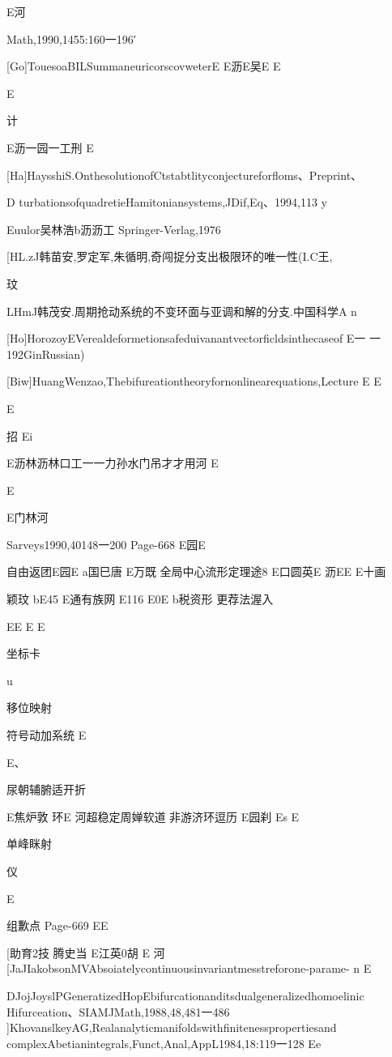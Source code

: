 E河

Math,1990,1455:160一196′

[Go]TouesoaBILSummaneuricorscovweterE
E沥E吴E
E

E

计

E沥一园一工刑
E

[Ha]HaysshiS.OnthesolutionofCtstabtlityconjectureforfloms、Preprint、

D
turbationsofquadretieHamitoniansystems,JDif,Eq、1994,113
y

Euulor吴林浩b沥沥工
Springer-Verlag,1976

[HL.zJ韩苗安,罗定军,朱循明,奇闯捉分支出极限环的唯一性(I.C王,

玟

LHmJ韩茂安.周期抢动系统的不变环面与亚调和解的分支.中国科学A
n

[Ho]HorozoyEVerealdeformetionsafeduivanantvectorficldsinthecaseof
E一
一192GinRussian)

[Biw]HuangWenzao,Thebifureationtheoryfornonlinearequations,Lecture
E
E

E

招
Ei

E沥林沥林口工一一力孙水门吊才才用河
E

E

E门林河

Sarveys1990,40148一200
Page-668
E园E

自由返团E园E
a国巳唐
E万既
全局中心流形定理途8
E口圆英E
沥EE
E十画

颖玟
bE45
E通有族网
E116
E0E
b税资形
更荐法渥入

EE
E
E

坐标卡

u

移位映射

符号动加系统
E

E、

尿朝辅腑适开折

E焦炉敦
环E
河超稳定周婵软道
非游济环逗历
E园刹
Es
E

单峰眯射

仪

E

组歉点
Page-669
EE

[助育2技
腾史当
E江英0胡
E
河
[JaJIakobsonMVAbsoiatelycontinuousinvariantmesstreforone-parame-
n
E

DJojJoyslPGeneratizedHopEbifurcationanditsdualgeneralizedhomoelinic
Hifurceation、SIAMJMath,1988,48,481一486
]KhovanslkeyAG,Realanalyticmanifoldswithfinitenesspropertiesand
complexAbetianintegrals,Funct,Anal,AppL1984,18:119一128
Ee

